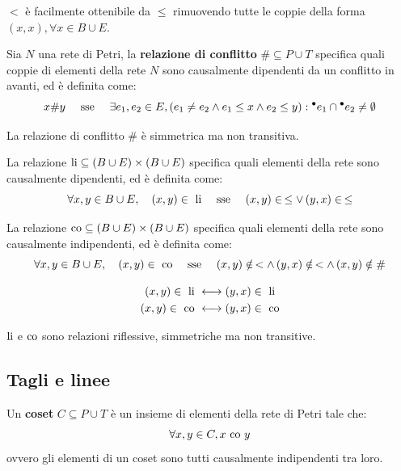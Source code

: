 \begin{rem}
    $<$ è facilmente ottenibile da $\le$ rimuovendo tutte le coppie della forma
    $(x,x), \forall x \in B \cup E$.
\end{rem}

\begin{defn}
    Sia $N$ una rete di Petri, la \textbf{relazione di conflitto}
    $\# \subseteq P \cup T$ specifica quali coppie di elementi della rete $N$
    sono causalmente dipendenti da un conflitto in avanti, ed è definita come:
    \[
        x \# y \quad \textnormal{ sse } \quad \exists e_1, e_2 \in E,
        (e_1 \neq e_2 \land e_1 \le x \land e_2 \le y) :
        {^\bullet}e_1 \cap {^\bullet}e_2 \neq \emptyset
    \]
\end{defn}

\begin{rem}
    La relazione di conflitto $\#$ è simmetrica ma non transitiva.
\end{rem}

\begin{defn}
    La relazione $\textnormal{li} \subseteq (B \cup E) \times (B \cup E)$ specifica
    quali elementi della rete sono causalmente dipendenti, ed è definita come:
    \[
        \forall x, y \in B \cup E, \quad (x, y) \in \textnormal{ li} \quad
        \textnormal{ sse } \quad (x,y) \in \, \le \lor \, (y,x) \in \, \le
    \]
\end{defn}

\begin{defn}
    La relazione $\textnormal{co} \subseteq (B \cup E) \times (B \cup E)$ specifica
    quali elementi della rete sono causalmente indipendenti, ed è definita come:
    \[
        \forall x, y \in B \cup E, \quad (x, y) \in \textnormal{ co} \quad \textnormal{ sse } \quad
        (x,y) \notin \, < \land \, (y,x) \notin \, < \land \, (x,y) \notin \#
    \]
\end{defn}

\begin{rem}
    \begin{align*}
        (x,y) \in \textnormal{ li } &\longleftrightarrow (y,x) \in \textnormal{ li}\\
        (x,y) \in \textnormal{ co } &\longleftrightarrow (y,x) \in \textnormal{ co}
    \end{align*}
\end{rem}
\begin{rem}
    $\textnormal{li}$ e $\textnormal{co}$ sono relazioni riflessive, simmetriche ma non
    transitive.
\end{rem}

\subsection*{Tagli e linee}
\begin{defn}
    Un \textbf{coset} $C \subseteq P \cup T$ è un insieme di elementi
    della rete di Petri tale che:
    \[
        \forall x, y \in C, x \textnormal{ co } y
    \]
    ovvero gli elementi di un coset sono tutti causalmente indipendenti tra
    loro.
\end{defn}

